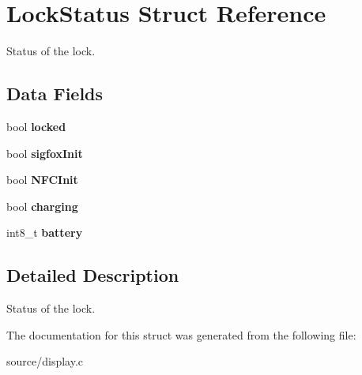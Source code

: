 \hypertarget{struct_lock_status}{}\section{Lock\+Status Struct Reference}
\label{struct_lock_status}


Status of the lock.  


\subsection*{Data Fields}
\begin{DoxyCompactItemize}
\item 
\mbox{\label{struct_lock_status_a18a0f1e6c3d21c252b14ea6ae162e2ff}} 
bool {\bfseries locked}
\item 
\mbox{\label{struct_lock_status_adbdc3376a5ca467b13e4ba7a1218aacb}} 
bool {\bfseries sigfox\+Init}
\item 
\mbox{\label{struct_lock_status_a52ef7e155e401431a5e8f0b8df6f2d40}} 
bool {\bfseries N\+F\+C\+Init}
\item 
\mbox{\label{struct_lock_status_a1a3cf53e375d57f1f6692704d2701265}} 
bool {\bfseries charging}
\item 
\mbox{\label{struct_lock_status_aef3af094c3bf50a379d93d688425f62e}} 
int8\+\_\+t {\bfseries battery}
\end{DoxyCompactItemize}


\subsection{Detailed Description}
Status of the lock. 



The documentation for this struct was generated from the following file\+:\begin{DoxyCompactItemize}
\item 
source/display.\+c\end{DoxyCompactItemize}
